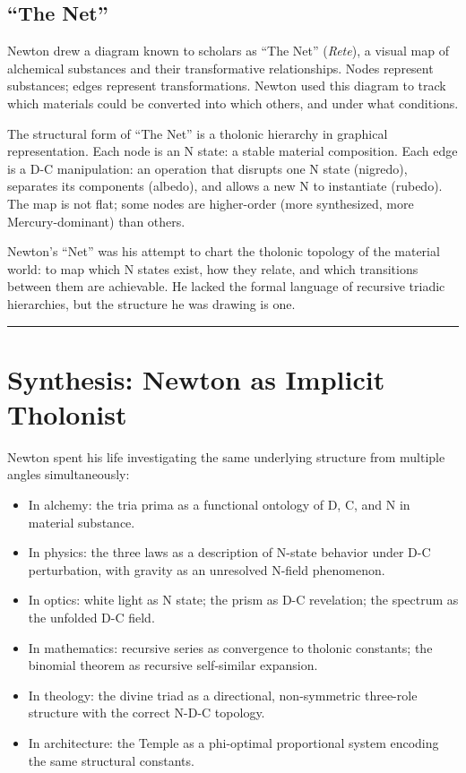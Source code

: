 \documentclass[12pt]{article}
\providecommand{\tightlist}{%
  \setlength{\itemsep}{0pt}\setlength{\parskip}{0pt}}
\begin{document}
\subsection{``The Net''}\label{the-net}

Newton drew a diagram known to scholars as ``The Net'' (\emph{Rete}), a
visual map of alchemical substances and their transformative
relationships. Nodes represent substances; edges represent
transformations. Newton used this diagram to track which materials could
be converted into which others, and under what conditions.

The structural form of ``The Net'' is a tholonic hierarchy in graphical
representation. Each node is an N state: a stable material composition.
Each edge is a D-C manipulation: an operation that disrupts one N state
(nigredo), separates its components (albedo), and allows a new N to
instantiate (rubedo). The map is not flat; some nodes are higher-order
(more synthesized, more Mercury-dominant) than others.

Newton's ``Net'' was his attempt to chart the tholonic topology of the
material world: to map which N states exist, how they relate, and which
transitions between them are achievable. He lacked the formal language
of recursive triadic hierarchies, but the structure he was drawing is
one.

\begin{center}\rule{0.5\linewidth}{0.5pt}\end{center}

\section{Synthesis: Newton as Implicit Tholonist}\label{synthesis-newton-as-implicit-tholonist}

Newton spent his life investigating the same underlying structure from
multiple angles simultaneously:

\begin{itemize}
\tightlist
\item
  In alchemy: the tria prima as a functional ontology of D, C, and N in
  material substance.
\item
  In physics: the three laws as a description of N-state behavior under
  D-C perturbation, with gravity as an unresolved N-field phenomenon.
\item
  In optics: white light as N state; the prism as D-C revelation; the
  spectrum as the unfolded D-C field.
\item
  In mathematics: recursive series as convergence to tholonic constants;
  the binomial theorem as recursive self-similar expansion.
\item
  In theology: the divine triad as a directional, non-symmetric
  three-role structure with the correct N-D-C topology.
\item
  In architecture: the Temple as a phi-optimal proportional system
  encoding the same structural constants.
\end{itemize}
\end{document}
